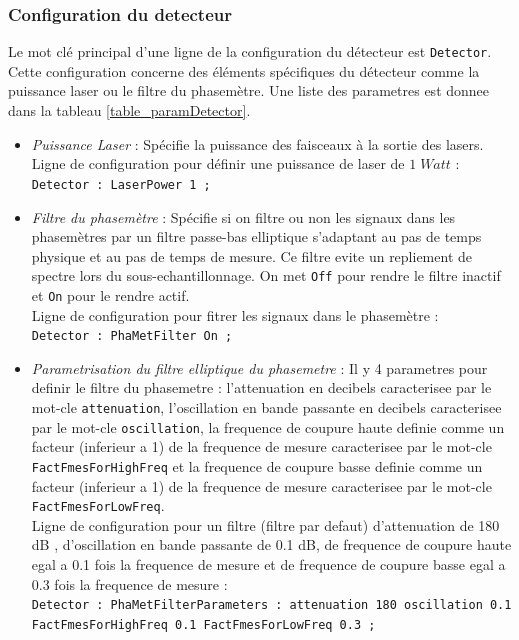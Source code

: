 \documentclass[a4paper,english,12pt]{article}
\begin{document}
\subsubsection{Configuration du detecteur}
\label{SSSConfigDetector}
Le mot cl\'e principal d'une ligne de la configuration du d\'etecteur est  \texttt{Detector}. Cette configuration concerne des \'el\'ements sp\'ecifiques du d\'etecteur comme la puissance laser ou le filtre du phasem\`etre. Une liste des parametres est donnee dans la tableau \ref{table_paramDetector}.
\begin{itemize}
\item { \it Puissance Laser } : Sp\'ecifie la puissance des faisceaux \`a la sortie des lasers.\\
Ligne de configuration pour d\'efinir une puissance de laser de $1\;  Watt$ : \\
\hphantom{aaaaa}\texttt{Detector : LaserPower 1 ;}  \\

\item { \it Filtre du phasem\`etre} : Sp\'ecifie si on filtre ou non les signaux dans les phasem\`etres par un filtre passe-bas elliptique s'adaptant au pas de temps physique et au pas de temps de mesure. Ce filtre evite un repliement de spectre lors du sous-echantillonnage. On met \texttt{Off} pour rendre le filtre inactif et \texttt{On} pour le rendre actif. \\
Ligne de configuration pour fitrer les signaux dans le phasem\`etre : \\
\hphantom{aaaaa}\texttt{Detector : PhaMetFilter On ;}  \\

\item { \it Parametrisation du filtre elliptique du phasemetre} : Il y 4 parametres pour definir le filtre du phasemetre : l'attenuation en decibels caracterisee par le mot-cle \texttt{attenuation}, l'oscillation en bande passante  en decibels caracterisee par le mot-cle \texttt{oscillation}, la frequence de coupure haute definie comme un facteur (inferieur a 1) de la frequence de mesure caracterisee par le mot-cle \texttt{FactFmesForHighFreq} et la frequence de coupure basse definie comme un facteur (inferieur a 1) de la frequence de mesure caracterisee par le mot-cle \texttt{FactFmesForLowFreq}.\\
Ligne de configuration pour un filtre (filtre par defaut) d'attenuation de 180 dB , d'oscillation en bande passante de 0.1 dB, de frequence de coupure haute egal a 0.1 fois la frequence de mesure et de frequence de coupure basse egal a 0.3 fois la frequence de mesure : \\
\hphantom{aaaaa}\texttt{Detector : PhaMetFilterParameters : attenuation 180 oscillation 0.1 FactFmesForHighFreq 0.1 FactFmesForLowFreq 0.3 ;}  \\
\end{itemize}
\end{document}
